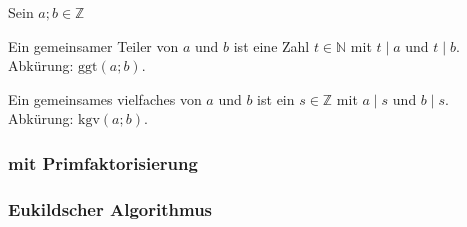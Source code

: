 Sein $a;b \in \mathbb{Z}$

Ein gemeinsamer Teiler von $a$ und $b$ ist eine Zahl $t \in \mathbb{N}$ mit $t \mid a$ und $t \mid b$. Abkürung: $\textrm{ggt}(a;b)$.

Ein gemeinsames vielfaches von $a$ und $b$ ist ein $s \in \mathbb{Z}$ mit $a \mid s$ und $b \mid s$. Abkürung: $\textrm{kgv}(a;b)$.

\subsubsection{mit Primfaktorisierung}


\subsubsection{Eukildscher Algorithmus}

